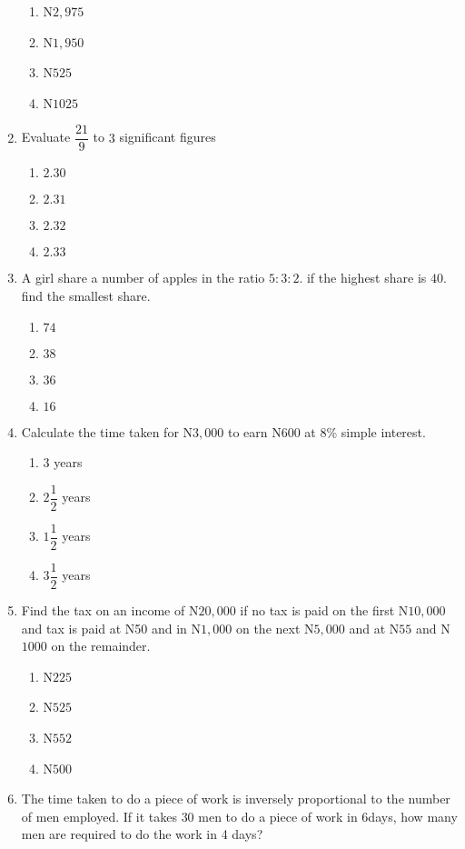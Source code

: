\begin{multicols}{2}
\begin{enumerate}[label={\arabic*.}]
    \begin{enumerate}[label={\Alph*.}]
    \item N\(2,975\)
    \item N\(1,950\)
    \item N\(525\)
    \item N\(1025\)
    \end{enumerate}
\item Evaluate \(\dfrac{21}{9}\) to \(3\) significant figures
    \begin{enumerate}[label={\Alph*.}]
    \item \(2.30\)
    \item \(2.31\)
    \item \(2.32\)
    \item \(2.33\)
    \end{enumerate}
\item A girl share a number of apples in the ratio \(5:3:2\). if the highest share is \(40\). find the smallest share.
    \begin{enumerate}[label={\Alph*.}]
    \item \(74\)
    \item \(38\)
    \item \(36\)
    \item \(16\)
    \end{enumerate}
\item Calculate the time taken for N\(3,000\) to earn N600 at 8\% simple interest.
    \begin{enumerate}[label={\Alph*.}]
    \item \(3\) years
    \item \(2\dfrac{1}{2}\) years
    \item \(1\dfrac{1}{2}\) years
    \item \(3\dfrac{1}{2}\) years
    \end{enumerate}
\item Find the tax on an income of N\(20,000\) if no tax is paid on the first N\(10,000\) and tax is paid at N50 and in N\(1,000\)
on the next N\(5,000\) and at N\(55\) and N\(1000\) on the remainder. 
    \begin{enumerate}[label={\Alph*.}]
    \item N\(225\)
    \item N\(525\)
    \item N\(552\)
    \item N\(500\)
    \end{enumerate}
\item The time taken to do a piece of work is inversely proportional to the number of men employed. If it takes \(30\) men to do a piece of work in \(6\)days, how many men are required to do the work in 4 days?

\end{enumerate}
\end{multicols}
